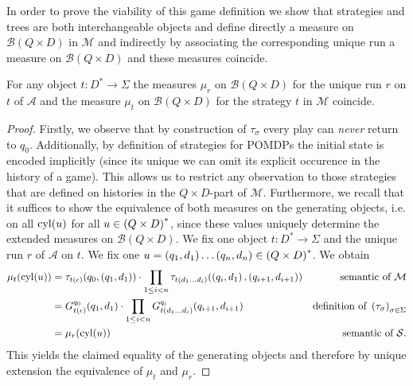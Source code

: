 In order to prove the viability of this game definition we show that strategies
and trees are both interchangeable objects and define directly a measure on
$\mathcal{B}(Q\times D)$ in $\mathcal{M}$ and indirectly by associating the 
corresponding unique run a measure on $\mathcal{B}(Q\times D)$ and these 
measures coincide.
\begin{theorem}
  For any object $t:D^{*}\rightarrow\Sigma$ the measures $\mu_{r}$ on 
  $\mathcal{B}(Q\times D)$ for the unique run $r$ on $t$ of $\mathcal{A}$ and
  the measure $\mu_{t}$ on $\mathcal{B}(Q\times D)$ for the strategy $t$ in
  $\mathcal{M}$ coincide.
\end{theorem}
\begin{proof}
  Firstly, we observe that by construction of $\tau_{\sigma}$ every play can
  \emph{never} return to $q_{0}$. Additionally, by definition of strategies for
  \acp{POMDP} the initial state is encoded implicitly (since its unique we can
  omit its explicit occurence in the history of a game). This allows us to 
  restrict any observation to those strategies that are defined on histories in
  the $Q\times D$-part of $\mathcal{M}$. Furthermore, we recall that it 
  suffices to show the equivalence of both measures on the generating objects, 
  i.e. on all $\operatorname{cyl}(u)$ for all $u\in\left(Q\times D\right)^{*}$, since these values 
  uniquely determine the extended measures on $\mathcal{B}(Q\times D)$. We fix 
  one object $t:D^{*}\rightarrow\Sigma$ and the unique run $r$ of $\mathcal{A}$ 
  on $t$. We fix one 
  $u = \left(q_{1}, d_{1}\right)\dots\left(q_{n}, d_{n}\right)\in\left(Q\times D\right)^{*}$. 
  We obtain
  \begin{align*}
    \mu_{t}(\operatorname{cyl}(u)) &= \tau_{t(\epsilon)}(q_{0}, \left(q_{1}, d_{1}\right))\cdot
      \prod\limits_{1\leq i < n}\tau_{t(d_{1}\dots d_{i})}(
        \left(q_{i}, d_{1}\right), \left(q_{i+1}, d_{i+1}\right))&
          \text{semantic of }\mathcal{M}\\
    &= G_{t(\epsilon)}^{q_{0}}(q_{1}, d_{1})\cdot\prod\limits_{1\leq i < n}
      G_{t(d_{1}\dots d_{i})}^{q_{i}}(q_{i+1}, d_{i+1})&
          \text{definition of }\left(\tau_{\sigma}\right)_{\sigma\in\Sigma}\\
    &= \mu_{r}(\operatorname{cyl}(u))&\text{semantic of }\mathcal{S}.
  \end{align*}
  This yields the claimed equality of the generating objects and therefore by
  unique extension the equivalence of $\mu_{t}$ and $\mu_{r}$.
\end{proof}

